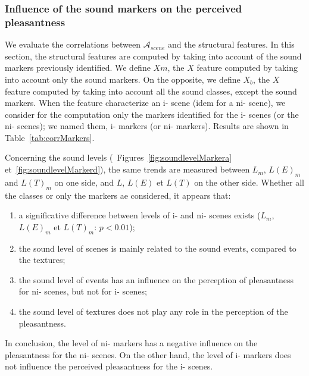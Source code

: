 \documentclass[twoside,twocolumn]{article}
\begin{document}
\subsubsection*{Influence of the sound markers on the perceived pleasantness}

We evaluate the correlations between $\mathcal{A}_{scene}$ and the structural features. In this section, the structural features are computed by taking into account of the sound markers previously identified. We define $Xm$, the $X$ feature computed by taking into account only the sound markers. On the opposite, we define $X_b$, the $X$ feature computed by taking into account all the sound classes, except the sound markers. When the feature characterize an i- scene (idem for a ni- scene), we consider for the computation only the markers identified for the i- scenes (or the ni- scenes); we named them, i- markers (or ni- markers). Results are shown in Table~\ref{tab:corrMarkers}.

Concerning the sound levels (\cf~Figures~\ref{fig:soundlevelMarkera} et~\ref{fig:soundlevelMarkerd}), the same trends are measured between $L_m$, $L(E)_m$ and $L(T)_m$ on one side, and $L$, $L(E)$ et $L(T)$ on the other side. Whether all the classes or only the markers ae considered, it appears that:

\begin{enumerate}
\item a significative difference between levels of i- and ni- scenes exists ($L_m$, $L(E)_m$ et $L(T)_m$: $p<0.01$);
\item the sound level of scenes is mainly related to the sound events, compared to the textures;
\item the sound level of events has an influence on the perception of pleasantness for ni- scenes, but not for i- scenes;
\item the sound level of textures does not play any role in the perception of the pleasantness.
\end{enumerate}

In conclusion, the level of ni- markers has a negative influence on the pleasantness for the ni- scenes. On the other hand, the level of i- markers does not influence the perceived pleasantness for the i- scenes.

\end{document}
